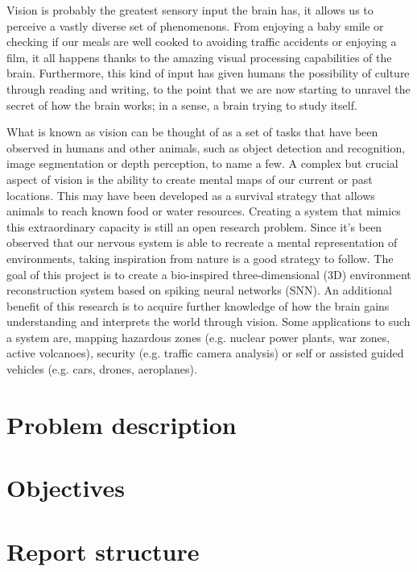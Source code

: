 Vision is probably the greatest sensory input the brain has, it allows us to perceive a vastly diverse set of phenomenons. From enjoying a baby smile or checking if our meals are well cooked to avoiding traffic accidents or enjoying a film, it all happens thanks to the amazing visual processing capabilities of the brain. Furthermore, this kind of input has given humans the possibility of culture through reading and writing, to the point that we are now starting to unravel the secret of how the brain works; in a sense, a brain trying to study itself.

What is known as vision can be thought of as a set of tasks that have been observed in humans and other animals, such as object detection and recognition, image segmentation or depth perception, to name a few. A complex but crucial aspect of vision is the ability to create mental maps of our current or past locations. This may have been developed as a survival strategy that allows animals to reach known food or water resources. Creating a system that mimics this extraordinary capacity is still an open research problem. Since it's been observed that our nervous system is able to recreate a mental representation of  environments, taking inspiration from nature is a good strategy to follow. The goal of this project is to create a bio-inspired three-dimensional (3D) environment reconstruction system based on spiking neural networks (SNN). An additional benefit of this research is to acquire further knowledge of how the brain gains understanding and interprets the world through vision. Some applications to such a system are, mapping hazardous zones (e.g. nuclear power plants, war zones, active volcanoes), security (e.g. traffic camera analysis) or self or assisted guided vehicles (e.g. cars, drones, aeroplanes).

\section{Problem description}
\label{sec:intro:problem}


\section{Objectives}
\label{sec:intro:objectives}

%

\section{Report structure}
\label{sec:intro:structure}
